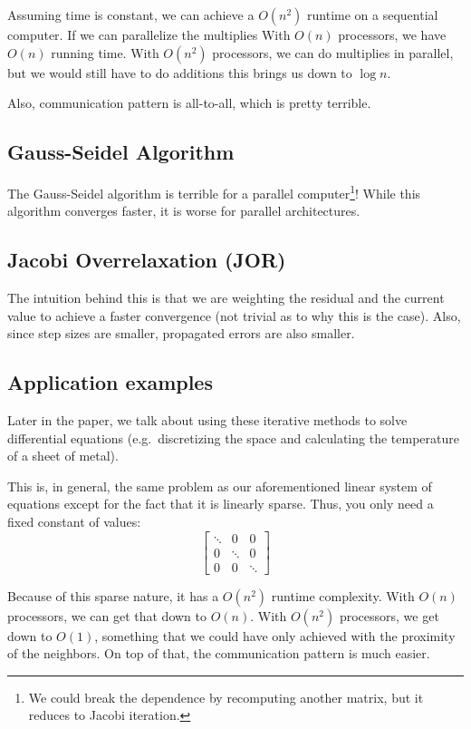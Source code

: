 Assuming time is constant, we can achieve a \( O (n^2) \) runtime on a sequential computer. If we can parallelize the multiplies With \( O(n) \) processors, we have \( O(n) \) running time. With \( O(n^2) \) processors, we can do multiplies in parallel, but we would still have to do additions this brings us down to \( \log{n} \).

Also, communication pattern is all-to-all, which is pretty terrible.

\subsection{Gauss-Seidel Algorithm}

The Gauss-Seidel algorithm is terrible for a parallel computer\footnote{We could break the dependence by recomputing another matrix, but it reduces to Jacobi iteration.}! While this algorithm converges faster, it is worse for parallel architectures.

\subsection{Jacobi Overrelaxation (JOR)}
The intuition behind this is that we are weighting the residual and the current value to achieve a faster convergence (not trivial as to why this is the case). Also, since step sizes are smaller, propagated errors are also smaller.

\subsection{Application examples}

Later in the paper, we talk about using these iterative methods to solve differential equations (e.g.\ discretizing the space and calculating the temperature of a sheet of metal).

This is, in general, the same problem as our aforementioned linear system of equations except for the fact that it is linearly sparse. Thus, you only need a fixed constant of values:
\[
\begin{bmatrix}
    \ddots & 0 & 0 \\
    0 & \ddots & 0 \\
    0 & 0 & \ddots
\end{bmatrix}
\]

Because of this sparse nature, it has a \( O(n^2) \) runtime complexity. With \( O(n) \) processors, we can get that down to \( O(n) \). With \( O(n^2) \) processors, we get down to \( O(1) \), something that we could have only achieved with the proximity of the neighbors. On top of that, the communication pattern is much easier.

